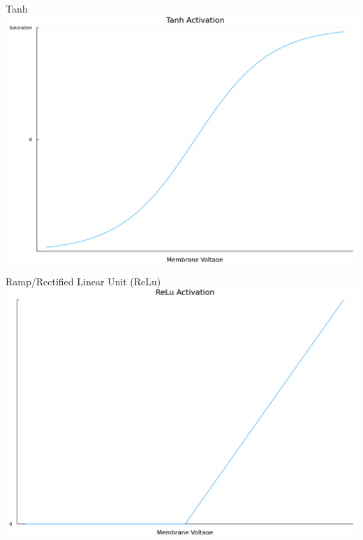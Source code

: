\documentclass[
  ignorenonframetext,
]{beamer}
\begin{document}
\begin{frame}{Tanh}
\protect\hypertarget{tanh}{}
\includegraphics{lecture2_files/figure-beamer/cell-7-output-1.pdf}
\end{frame}

\begin{frame}{Ramp/Rectified Linear Unit (ReLu)}
\protect\hypertarget{ramprectified-linear-unit-relu}{}
\includegraphics{lecture2_files/figure-beamer/cell-8-output-1.pdf}
\end{frame}
\end{document}
